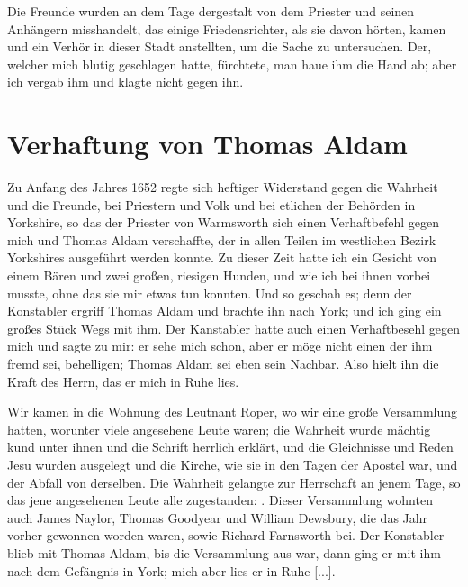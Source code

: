 Die Freunde
wurden an dem Tage dergestalt von dem Priester und seinen
Anhängern misshandelt, das einige Friedensrichter, als sie davon
hörten, kamen und ein Verhör in dieser Stadt anstellten, um
die Sache zu untersuchen. Der, welcher mich blutig geschlagen
hatte, fürchtete, man haue ihm die Hand ab; aber ich vergab
ihm und klagte nicht gegen ihn.

\section{Verhaftung von Thomas Aldam}

Zu Anfang des Jahres 1652 regte sich heftiger Widerstand
gegen die Wahrheit und die Freunde, bei Priestern und Volk
und bei etlichen der Behörden in Yorkshire, 
so das der Priester
von Warmsworth sich einen Verhaftbefehl gegen mich und Thomas
Aldam verschaffte, der in allen 
Teilen im westlichen Bezirk Yorkshires ausgeführt 
werden konnte. Zu dieser Zeit hatte ich ein
Gesicht von einem Bären und zwei großen, 
riesigen Hunden, und
wie ich bei ihnen vorbei musste, ohne das sie mir etwas tun
konnten. Und so geschah es; denn der Konstabler ergriff Thomas
Aldam und brachte ihn nach York; und ich ging 
ein großes Stück
Wegs mit ihm. Der Kanstabler hatte auch einen Verhaftbesehl
gegen mich und sagte zu mir: er sehe mich schon, aber er möge
nicht einen der ihm fremd sei, behelligen; Thomas Aldam sei
eben sein Nachbar. Also hielt ihn die Kraft des Herrn, das er
mich in Ruhe lies. 

Wir kamen in die Wohnung des Leutnant 
Roper, wo wir eine 
große Versammlung hatten, worunter viele
angesehene Leute waren; die Wahrheit wurde mächtig kund
unter ihnen und die Schrift herrlich erklärt, und die Gleichnisse
und Reden Jesu wurden ausgelegt und die Kirche, wie sie in den
Tagen der Apostel war, und der Abfall von derselben. Die
Wahrheit gelangte zur Herrschaft an jenem Tage, so das jene
angesehenen Leute alle zugestanden: . Dieser Versammlung
wohnten auch James Naylor, 
Thomas Goodyear und 
William Dewsbury, die das 
Jahr vorher gewonnen worden waren, sowie
Richard Farnsworth bei. Der 
Konstabler blieb mit Thomas
Aldam, bis die Versammlung aus war, dann ging er mit ihm
nach dem Gefängnis in York; mich aber lies er in Ruhe [...].

